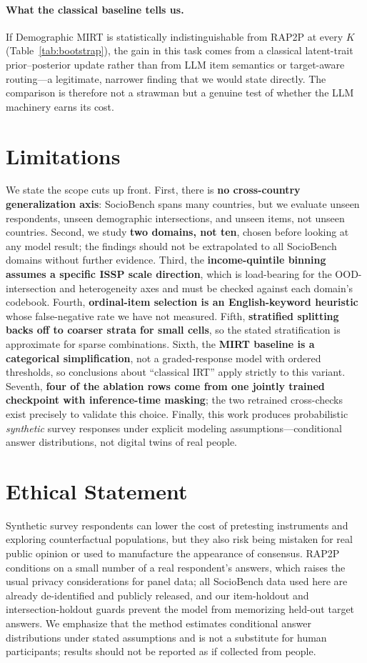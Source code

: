 \documentclass[letterpaper]{article} %
\begin{document}
\paragraph{What the classical baseline tells us.}
If Demographic MIRT is statistically indistinguishable from RAP2P at every $K$
(Table~\ref{tab:bootstrap}), the gain in this task comes from a classical
latent-trait prior--posterior update rather than from LLM item semantics or
target-aware routing---a legitimate, narrower finding that we would state
directly. The comparison is therefore not a strawman but a genuine test of
whether the LLM machinery earns its cost.

\section{Limitations}
\label{sec:limitations}
We state the scope cuts up front. First, there is \textbf{no cross-country
generalization axis}: SocioBench spans many countries, but we evaluate unseen
respondents, unseen demographic intersections, and unseen items, not unseen
countries. Second, we study \textbf{two domains, not ten}, chosen before
looking at any model result; the findings should not be extrapolated to all
SocioBench domains without further evidence. Third, the \textbf{income-quintile
binning assumes a specific ISSP scale direction}, which is load-bearing for the
OOD-intersection and heterogeneity axes and must be checked against each
domain's codebook. Fourth, \textbf{ordinal-item selection is an
English-keyword heuristic} whose false-negative rate we have not measured.
Fifth, \textbf{stratified splitting backs off to coarser strata for small
cells}, so the stated stratification is approximate for sparse combinations.
Sixth, the \textbf{MIRT baseline is a categorical simplification}, not a
graded-response model with ordered thresholds, so conclusions about
``classical IRT'' apply strictly to this variant. Seventh, \textbf{four of the
ablation rows come from one jointly trained checkpoint with inference-time
masking}; the two retrained cross-checks exist precisely to validate this
choice. Finally, this work produces probabilistic \emph{synthetic} survey
responses under explicit modeling assumptions---conditional answer
distributions, not digital twins of real people.

\section{Ethical Statement}
Synthetic survey respondents can lower the cost of pretesting instruments and
exploring counterfactual populations, but they also risk being mistaken for
real public opinion or used to manufacture the appearance of consensus. RAP2P
conditions on a small number of a real respondent's answers, which raises the
usual privacy considerations for panel data; all SocioBench data used here are
already de-identified and publicly released, and our item-holdout and
intersection-holdout guards prevent the model from memorizing held-out target
answers. We emphasize that the method estimates conditional answer
distributions under stated assumptions and is not a substitute for human
participants; results should not be reported as if collected from people.


\end{document}
